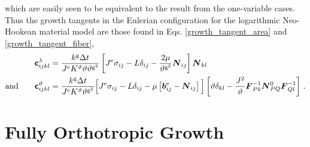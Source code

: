 \documentclass[10pt,letterpaper,oneside]{report}
\newcommand{\ten}[1]{\mbox{\boldmath $#1$}{}}
\newcommand{\tenf}[1]{\mbox{{\sffamily{\bfseries {#1}}}}}
\newcommand{\scas}[1]{\mbox{{\scriptsize{${\rm{#1}}$}}}{}}
\begin{document}
which are easily seen to be equivalent to the result from the one-variable cases.  Thus the growth tangents in the Eulerian configuration for the logarithmic Neo-Hookean material model are those found in Eqs. \ref{growth_tangent_area} and \ref{growth_tangent_fiber}, 
\begin{align*}
\tenf{c}^{\lambda}_{ijkl} ={}& \frac{k^{\scas{g}} \Delta t}{J^{\scas{e}} K^\vartheta \vartheta \vartheta^{\scas{g}^2} } 
\left[ J^{\scas{e}} \sigma_{ij} - L \delta_{ij} - \frac{2 \mu}{\vartheta^{\scas{g}^2}} \ten{N}_{ij} \right] 
\ten{N}_{kl} 
\\ \mbox{and} \qquad
\tenf{c}^{\vartheta}_{ijkl} 
={}& \frac{k^{\scas{g}} \Delta t}{J^{\scas{e}} K^\vartheta \vartheta^{\scas{g}^2} } 
\Big[ J^{\scas{e}} \sigma_{ij} - L \delta_{ij} - \mu \left[ \ten{b}^{\scas{e}}_{ij} - \ten{N}_{ij} \right] \Big] 
\left[ \vartheta \delta_{kl} - \frac{J^2}{\vartheta} \ten{F}^{-1}_{Pk} \ten{N}^0_{PQ} \ten{F}^{-1}_{Ql} \right] \, . 
\end{align*}


\section{Fully Orthotropic Growth}
\end{document}

